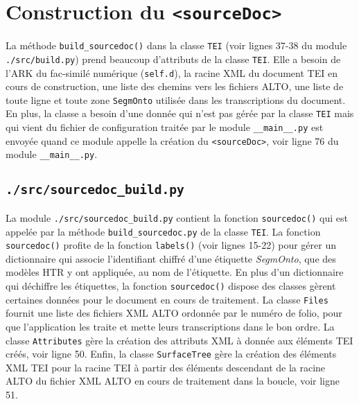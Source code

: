 \documentclass[class=article, crop=false]{standalone}
\begin{document}
\section{Construction du \texttt{<sourceDoc>}}
La méthode \texttt{build\_sourcedoc()} dans la classe \texttt{TEI} (voir lignes 37-38 du module \texttt{./src/build.py}) prend beaucoup d'attributs de la classe \texttt{TEI}. Elle a besoin de l'\acrshort{ARK} du fac-similé numérique (\texttt{self.d}), la racine \acrshort{XML} du document \acrshort{TEI} en cours de construction, une liste des chemins vers les fichiers \acrshort{ALTO}, une liste de toute ligne et toute zone \texttt{SegmOnto} utilisée dans les transcriptions du document. En plus, la classe a besoin d'une donnée qui n'est pas gérée par la classe \texttt{TEI} mais qui vient du fichier de configuration traitée par le module \texttt{\_\_main\_\_.py} est envoyée quand ce module appelle la création du \texttt{<sourceDoc>}, voir ligne 76 du module  \texttt{\_\_main\_\_.py}.

\subsection{\texttt{./src/sourcedoc\_build.py}}
La module \texttt{./src/sourcedoc\_build.py} contient la fonction \texttt{sourcedoc()} qui est appelée par la méthode \texttt{build\_sourcedoc.py} de la classe \texttt{TEI}. La fonction \texttt{sourcedoc()} profite de la fonction \texttt{labels()} (voir lignes 15-22) pour gérer un dictionnaire qui associe l'identifiant chiffré d'une étiquette \textit{SegmOnto}, que des modèles \acrshort{HTR} y ont appliquée, au nom de l'étiquette. En plus d'un dictionnaire qui déchiffre les étiquettes, la fonction \texttt{sourcedoc()} dispose des classes gèrent certaines données pour le document en cours de traitement. La classe \texttt{Files} fournit une liste des fichiers \acrshort{XML} \acrshort{ALTO} ordonnée par le numéro de folio, pour que l'application les traite et mette leurs transcriptions dans le bon ordre. La classe \texttt{Attributes} gère la création des attributs \acrshort{XML} à donnée aux éléments \acrshort{TEI} créés, voir ligne 50. Enfin, la classe \texttt{SurfaceTree} gère la création des éléments \acrshort{XML} \acrshort{TEI} pour la racine \acrshort{TEI} à partir des éléments descendant de la racine \acrshort{ALTO} du fichier \acrshort{XML} \acrshort{ALTO} en cours de traitement dans la boucle, voir ligne 51.
\end{document}
